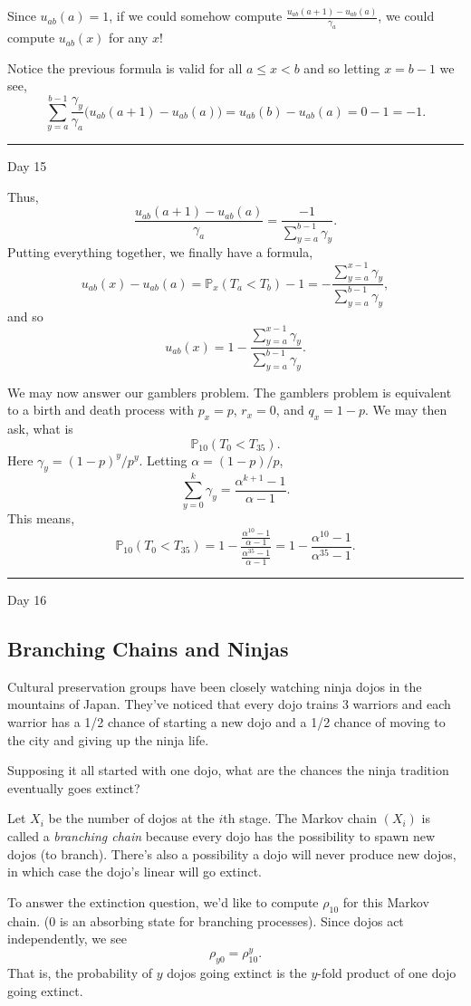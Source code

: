 \documentclass{problemset}
\newcommand{\1}{\mathbf{1}}
\renewcommand{\P}{\mathbb{P}}
\newcommand{\fatrule}[1]{\vspace{.3cm}\hrule {\hfill \sf #1}\par}
\begin{document}
	Since $u_{ab}(a)=1$, if we could somehow compute $\frac{u_{ab}(a+1)-u_{ab}(a)}{\gamma_a}$, we could compute $u_{ab}(x)$ for any $x$!

	Notice the previous formula is valid for all $a\leq x<b$ and so letting $x=b-1$ we see,
	\[
		\sum_{y=a}^{b-1} \frac{\gamma_y}{\gamma_a}\Big(u_{ab}(a+1)-u_{ab}(a)\Big)
		=u_{ab}(b)-u_{ab}(a) = 0-1=-1.
	\]

	\fatrule{Day 15}
	Thus, 
	\[
		\frac{u_{ab}(a+1)-u_{ab}(a)}{\gamma_a} = \frac{-1}{\displaystyle \sum_{y=a}^{b-1} \gamma_y}.
	\]
	Putting everything together, we finally have a formula,
	\[
		u_{ab}(x) - u_{ab}(a) = \P_x(T_a<T_b)-1 = -\frac{\sum_{y=a}^{x-1} \gamma_y}{\sum_{y=a}^{b-1}\gamma_y},
	\]
	and so
	\[
		u_{ab}(x)  = 1-\frac{\sum_{y=a}^{x-1} \gamma_y}{\sum_{y=a}^{b-1}\gamma_y}.
	\]


	\vspace{.5cm}
	We may now answer our gamblers problem.  The gamblers problem is equivalent to a birth and death 
	process with $p_x=p$, $r_x=0$, and $q_x=1-p$.  We may then ask, what is
	\[
		\P_{10}(T_0 < T_{35}).
	\]
	Here $\gamma_y = (1-p)^y/p^y$.  Letting $\alpha = (1-p)/p$,
	\[
		\sum_{y=0}^{k} \gamma_y = \frac{\alpha^{k+1}-1}{\alpha-1}.
	\]
	This means,
	\[
		\P_{10}(T_0 < T_{35}) = 1-\frac{\frac{\alpha^{10}-1}{\alpha-1}}  {\frac{\alpha^{35}-1}{\alpha-1}} = 1-\frac{\alpha^{10}-1}{\alpha^{35}-1}.
	\]

	\fatrule{Day 16}
\subsection*{Branching Chains and Ninjas}

	Cultural preservation groups have been closely
	watching ninja dojos in the mountains of Japan.
	They've noticed that every dojo trains 3 warriors and
	each warrior has a 1/2 chance of starting a new
	dojo and a 1/2 chance of moving to the city and giving
	up the ninja life.

	Supposing it all started with one dojo, what are the chances
	the ninja tradition eventually goes extinct?

	Let $X_i$ be the number of dojos
	at the $i$th stage.  The Markov chain $(X_i)$ is called
	a \emph{branching chain} because every dojo has the possibility to
	spawn new dojos (to branch).  There's also a possibility a dojo will
	never produce new dojos, in which case the dojo's linear will go extinct.

	To answer the extinction question, we'd like to compute $\rho_{10}$ for this Markov chain.
	($0$ is an absorbing state for branching processes).  Since dojos act independently, we see
	\[
		\rho_{y0} = \rho_{10}^y.
	\]
	That is, the probability of $y$ dojos going extinct is the $y$-fold product of 
	one dojo going extinct.
\end{document}
